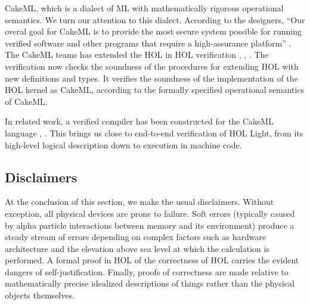 \documentclass[brochure,english,12pt]{bourbaki}
\theoremstyle{plain}
\begin{document}
CakeML, which
is a dialect of ML with mathematically rigorous operational semantics.  We turn our
attention to this dialect.    According to the designers, ``Our overal goal for CakeML
is to provide the most secure system possible for running verified software and other programs that require a high-assurance
platform'' \cite{CakeML}.
The CakeML teams has extended the HOL in HOL verification \cite{myreen2013steps}, \cite{myreen2013proof}, 
\cite{kumar2014hol}.  
The verification now checks the soundness of  the procedures for extending HOL with new definitions and types.
It verifies the soundness of the implementation of the HOL kernel as CakeML, according to the formally specified 
operational semantics of CakeML.  

In related work, a verified compiler has been constructed for the CakeML language 
 \cite{CakeML}, \cite{sarkar2009semantics}.
This brings us close to end-to-end verification of HOL Light, from its high-level logical description down to
execution in machine code.





\bigskip


\subsection{Disclaimers}

At the conclusion of this section, we make the usual disclaimers.
Without exception, all physical devices are prone to failure.  Soft errors (typically 
caused by alpha particle interactions between memory and its environment) 
produce a steady
stream of errors depending on complex factors such as hardware architecture and
the elevation above sea level at which the
calculation is performed.  A formal proof in HOL of the correctness of HOL carries
the evident dangers of self-justification.  Finally, proofs of correctness are made relative to 
mathematically precise idealized descriptions of things rather than the physical objects
themselves.
\end{document}
